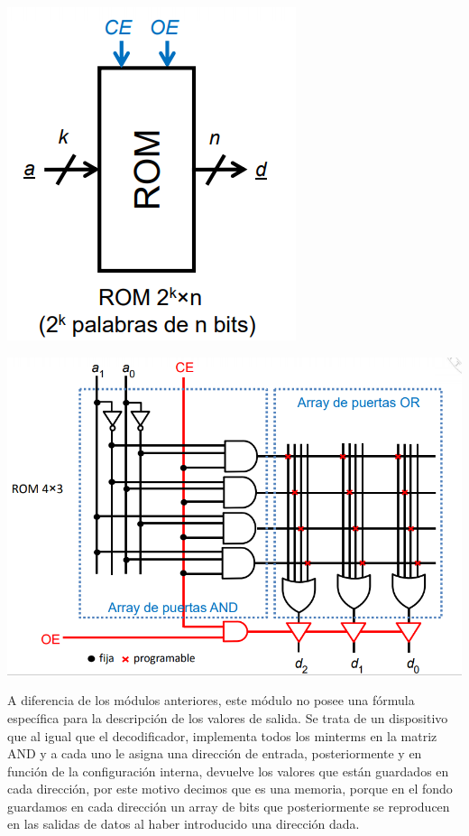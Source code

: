 \documentclass[a4paper,10pt]{book}
\begin{document}
\begin{multicols}{2}
\begin{center}
\includegraphics[scale=0.65]{ROM}
\end{center}

\begin{center}
\includegraphics[scale=0.35]{matrices ROM}
\end{center}
\end{multicols}


A diferencia de los módulos anteriores, este módulo no posee una fórmula específica para la descripción de los valores de salida. Se trata de un dispositivo que al igual que el decodificador, implementa todos los minterms en la matriz AND y a cada uno le asigna una dirección de entrada, posteriormente y en función de la configuración interna, devuelve los valores que están guardados en cada dirección, por este motivo decimos que es una memoria, porque en el fondo guardamos en cada dirección un array de bits que posteriormente se reproducen en las salidas de datos al haber introducido una dirección dada.
\end{document}
